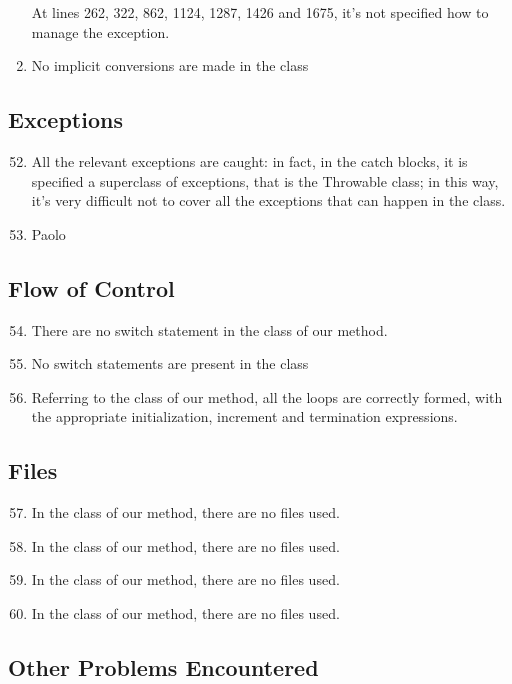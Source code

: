 \begin{enumerate}
    At lines 262, 322, 862, 1124, 1287, 1426 and 1675, it's not specified how to manage the exception.
	\item No implicit conversions are made in the class
\end{enumerate}
\subsection{Exceptions}
\begin{enumerate}
	\setcounter{enumi}{51}
	\item All the relevant exceptions are caught: in fact, in the catch blocks, it is specified a superclass of exceptions, that is the Throwable class; in this way, it's very difficult not to cover all the exceptions that can happen in the class.
	\item Paolo
\end{enumerate}
\subsection{Flow of Control}
\begin{enumerate}
	\setcounter{enumi}{53}
	\item There are no switch statement in the class of our method.
	\item No switch statements are present in the class
	\item Referring to the class of our method, all the loops are correctly formed, with the appropriate initialization, increment and termination expressions.
\end{enumerate}
\subsection{Files}
\begin{enumerate}
	\setcounter{enumi}{56}
	\item In the class of our method, there are no files used.
	\item In the class of our method, there are no files used.
	\item In the class of our method, there are no files used.
	\item In the class of our method, there are no files used.
\end{enumerate}
\subsection{Other Problems Encountered}